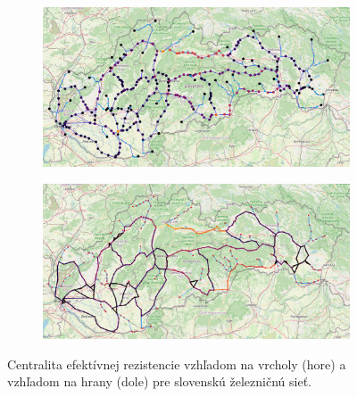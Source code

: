 \documentclass[main.tex]{subfiles}
\begin{document}
\begin{figure}
	\centering
	
	\begin{subfigure}{\linewidth}
		\centering
		\includegraphics[width=\textwidth]{images/svk_vertex_resistance.png}
	\end{subfigure}
	
	\vspace{0.5cm}
	
	\begin{subfigure}{\linewidth}
		\centering
		\includegraphics[width=\textwidth]{images/svk_edge_resistance.png}
	\end{subfigure}
	
	\caption{Centralita efektívnej rezistencie vzhľadom na vrcholy (hore) a vzhľadom na hrany (dole) pre slovenskú železničnú sieť.}
	\label{fig:resistance_svk}
\end{figure}
\end{document}

